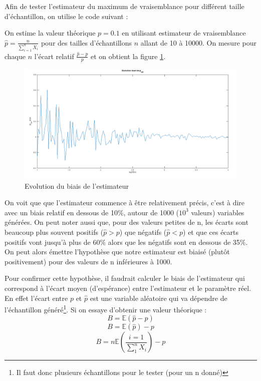 \documentclass[12pt,a4paper,titlepage]{article}
\numberwithin{equation}{section}
\begin{document}
Afin de tester l'estimateur du maximum de vraisemblance pour différent taille
d'échantillon, on utilise le code suivant :



On estime la valeur théorique $p=0.1$ en utilisant
estimateur de vraisemblance $\hat{p} = \frac{n}{\sum\limits_{i=1}^{n}X_i}$ pour des tailles d'échantillons $n$ allant de 10 à 10000.
On mesure pour chaque $n$ l'écart relatif $\frac{\hat{p}-p}{p}$ et on obtient la figure \ref{Evolution du biais de l'estimateur geom}.

\begin{figure}[!h]
\begin{center}
 \includegraphics[scale=0.3]{images/biaisGeom.png} 
\end{center}
 \caption{Evolution du biais de l'estimateur}
 \label{Evolution du biais de l'estimateur geom}
\end{figure}

On voit que que l'estimateur commence à être relativement précis, c'est à dire avec un biais relatif en dessous de 10\%, autour de 1000 ($10^3$ valeurs) variables générées. On peut noter aussi que, pour des valeurs petites de n, les écarts sont beaucoup plus souvent positifs ($\hat{p}>p$) que négatifs ($\hat{p}<p$) et que ces écarts positifs vont jusqu'à plus de 60\% alors que les négatifs sont en dessous de 35\%. On peut alors émettre l'hypothèse que notre estimateur est biaisé (plutôt positivement) pour des valeurs de n inférieures à 1000. 

Pour confirmer cette hypothèse, il faudrait calculer le biais de l'estimateur qui correspond à l'écart moyen (d'espérance) entre l'estimateur et le paramètre réel. En effet l'écart entre $p$ et $\hat{p}$ est une variable aléatoire qui va dépendre de l'échantillon généré\footnote{Il faut donc plusieurs échantillons pour le tester (pour un n donné)}. Si on essaye d'obtenir une valeur théorique :
\[B=\mathbb{E}(\hat{p} - p)\]
\[B=\mathbb{E}(\hat{p}) - p\]
\[B=n\mathbb{E}\left(\frac{i=1}{\sum\limits_{1}^{n}X_{i}}\right) - p\]
\end{document}
